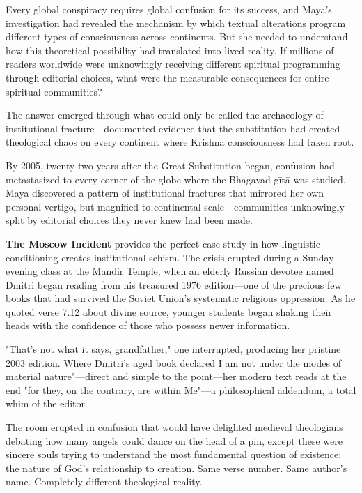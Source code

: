 \documentclass[12pt,twoside]{book}
\begin{document}
\vspace{0.3cm}

\normalfont\justifying
Every global conspiracy requires global confusion for its success, and Maya's investigation had revealed the mechanism by which textual alterations program different types of consciousness across continents. But she needed to understand how this theoretical possibility had translated into lived reality. If millions of readers worldwide were unknowingly receiving different spiritual programming through editorial choices, what were the measurable consequences for entire spiritual communities?

The answer emerged through what could only be called the archaeology of institutional fracture—documented evidence that the substitution had created theological chaos on every continent where Krishna consciousness had taken root.

By 2005, twenty-two years after the Great Substitution began, confusion had metastasized to every corner of the globe where the Bhagavad-gītā was studied. Maya discovered a pattern of institutional fractures that mirrored her own personal vertigo, but magnified to continental scale—communities unknowingly split by editorial choices they never knew had been made.

\textbf{\textbf{The Moscow Incident}} provides the perfect case study in how linguistic conditioning creates institutional schism. The crisis erupted during a Sunday evening class at the Mandir Temple, when an elderly Russian devotee named Dmitri began reading from his treasured 1976 edition—one of the precious few books that had survived the Soviet Union's systematic religious oppression. As he quoted verse 7.12 about divine source, younger students began shaking their heads with the confidence of those who possess newer information.

"That's not what it says, grandfather," one interrupted, producing her pristine 2003 edition. Where Dmitri's aged book declared I am not under the modes of material nature"—direct and simple to the point—her modern text reads at the end "for they, on the contrary, are within Me"—a philosophical addendum, a total whim of the editor.

The room erupted in confusion that would have delighted medieval theologians debating how many angels could dance on the head of a pin, except these were sincere souls trying to understand the most fundamental question of existence: the nature of God's relationship to creation. Same verse number. Same author's name. Completely different theological reality.
\end{document}
